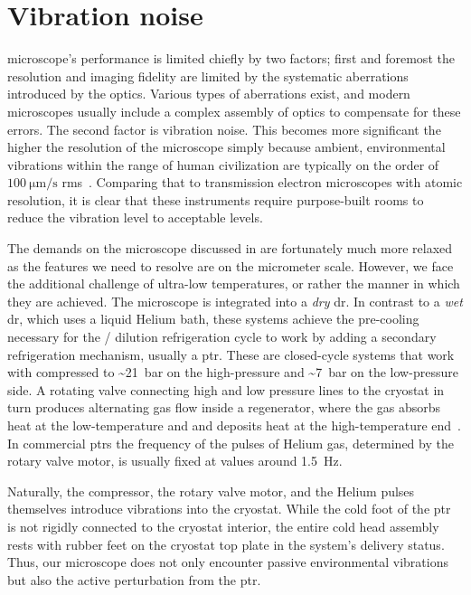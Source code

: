 \chapter{Vibration noise}\label{ch:setup:vibrations}
 microscope's performance is limited chiefly by two factors; first and foremost the resolution and imaging fidelity are limited by the systematic aberrations introduced by the optics.
Various types of aberrations exist, and modern microscopes usually include a complex assembly of optics to compensate for these errors.
The second factor is vibration noise.
This becomes more significant the higher the resolution of the microscope simply because ambient, environmental vibrations within the range of human civilization are typically on the order of $\qty{100}{\micro\meter\per\second}$ \gls{rms}~\cite{Gordon1999}.
Comparing that to transmission electron microscopes with atomic resolution, it is clear that these instruments require purpose-built rooms to reduce the vibration level to acceptable levels.

The demands on the microscope discussed in \thethesis are fortunately much more relaxed as the features we need to resolve are on the micrometer scale.
However, we face the additional challenge of ultra-low temperatures, or rather the manner in which they are achieved.
The microscope is integrated into a \emph{dry} \gls{dr}.
In contrast to a \emph{wet} \gls{dr}, which uses a liquid Helium bath, these systems achieve the pre-cooling necessary for the / dilution refrigeration cycle to work by adding a secondary refrigeration mechanism, usually a \gls{ptr}.
These are closed-cycle systems that work with  compressed to \textasciitilde\qty{21}{\bar} on the high-pressure and \textasciitilde\qty{7}{\bar} on the low-pressure side.
A rotating valve connecting high and low pressure lines to the cryostat in turn produces alternating gas flow inside a regenerator, where the gas absorbs heat at the low-temperature and and deposits heat at the high-temperature end~\cite{Radebaugh2009,DeWaele2011}.
In commercial \glspl{ptr} the frequency of the pulses of Helium gas, determined by the rotary valve motor, is usually fixed at values around \qty{1.5}{\hertz}.

Naturally, the compressor, the rotary valve motor, and the Helium pulses themselves introduce vibrations into the cryostat.
While the cold foot of the \gls{ptr} is not rigidly connected to the cryostat interior,
the entire cold head assembly rests with rubber feet on the cryostat top plate in the system's delivery status.
Thus, our microscope does not only encounter passive environmental vibrations but also the active perturbation from the \gls{ptr}.

